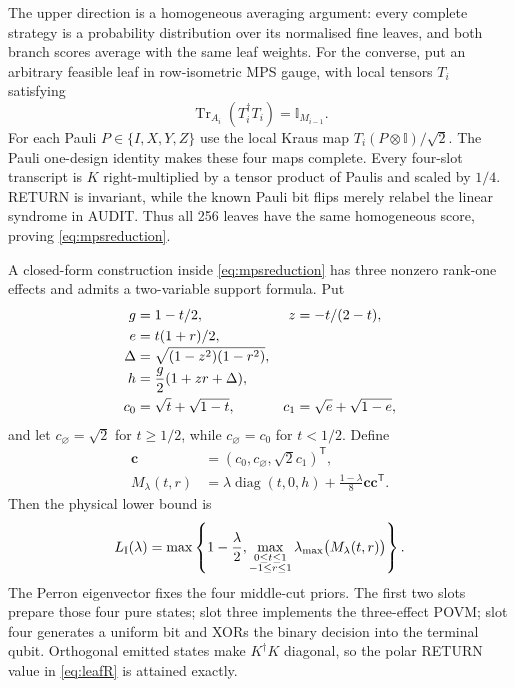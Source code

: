 \documentclass[10pt,twocolumn]{article}
\theoremstyle{remark}
\newcommand{\Tr}{\operatorname{Tr}}
\newcommand{\id}{\mathbb I}
\begin{document}
The upper direction is a homogeneous averaging argument: every complete
strategy is a probability distribution over its normalised fine leaves, and
both branch scores average with the same leaf weights. For the converse, put
an arbitrary feasible leaf in row-isometric MPS gauge, with local tensors
$T_i$ satisfying
\begin{equation}
\Tr_{A_i}(T_i^\dagger T_i)=\id_{M_{i-1}}.
\end{equation}
For each Pauli $P\in\{I,X,Y,Z\}$ use the local Kraus map
$T_i(P\otimes\id)/\sqrt2$. The Pauli one-design identity makes these four
maps complete. Every four-slot transcript is $K$ right-multiplied by a tensor
product of Paulis and scaled by $1/4$. RETURN is invariant, while the known
Pauli bit flips merely relabel the linear syndrome in AUDIT. Thus all 256
leaves have the same homogeneous score, proving \eqref{eq:mpsreduction}.

A closed-form construction inside \eqref{eq:mpsreduction} has three nonzero
rank-one effects and admits a two-variable support formula. Put
\begin{align}
g&=1-t/2,& z&=-t/(2-t),\notag\\
e&=t(1+r)/2,\notag\\[-1mm]
\Delta&=\sqrt{(1-z^2)(1-r^2)},\notag\\[-1mm]
h&=\frac g2(1+zr+\Delta),\label{eq:compacth}\\
c_0&=\sqrt t+\sqrt{1-t},&
c_1&=\sqrt e+\sqrt{1-e},\notag
\end{align}
and let $c_\varnothing=\sqrt2$ for $t\geq1/2$, while
$c_\varnothing=c_0$ for $t<1/2$. Define
\begin{equation}
\begin{aligned}
\bm c&=(c_0,c_\varnothing,\sqrt2c_1)^{\mathsf T},\\
M_\lambda(t,r)&=\lambda\operatorname{diag}(t,0,h)
+\frac{1-\lambda}{8}\bm c\bm c^{\mathsf T}.
\end{aligned}
\label{eq:compactmatrix}
\end{equation}
Then the physical lower bound is
\begin{equation}
L_{\rm I}(\lambda)=\max\left\{1-\frac\lambda2,
\max_{\substack{0\leq t\leq1\\-1\leq r\leq1}}
\lambda_{\max}\bigl(M_\lambda(t,r)\bigr)\right\}.
\label{eq:compactlower}
\end{equation}
The Perron eigenvector fixes the four middle-cut priors. The first two slots
prepare those four pure states; slot three implements the three-effect POVM;
slot four generates a uniform bit and XORs the binary decision into the
terminal qubit. Orthogonal emitted states make $K^\dagger K$ diagonal, so the
polar RETURN value in \eqref{eq:leafR} is attained exactly.
\end{document}
